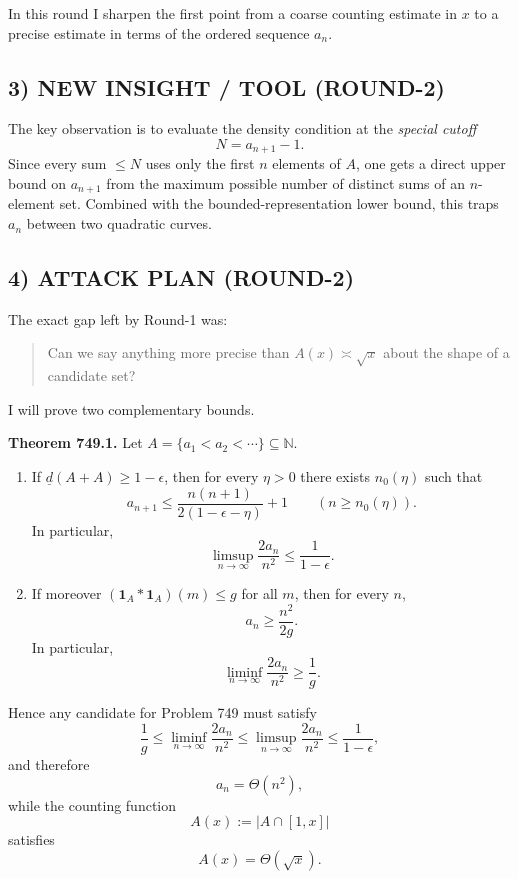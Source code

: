 In this round I sharpen the first point from a coarse counting estimate in $x$ to a precise estimate in terms of the ordered sequence $a_n$.

\subsection*{3) NEW INSIGHT / TOOL (ROUND-2)}

The key observation is to evaluate the density condition at the \emph{special cutoff}
\[
N=a_{n+1}-1.
\]
Since every sum $\le N$ uses only the first $n$ elements of $A$, one gets a direct upper bound on $a_{n+1}$ from the maximum possible number of distinct sums of an $n$-element set. Combined with the bounded-representation lower bound, this traps $a_n$ between two quadratic curves.

\subsection*{4) ATTACK PLAN (ROUND-2)}

The exact gap left by Round-1 was:
\begin{quote}
Can we say anything more precise than $A(x)\asymp \sqrt{x}$ about the shape of a candidate set?
\end{quote}

I will prove two complementary bounds.

\medskip
\noindent
\textbf{Theorem 749.1.}
Let $A=\{a_1<a_2<\cdots\}\subseteq\mathbb N$.

\begin{enumerate}
\item If $\underline d(A+A)\ge 1-\epsilon$, then for every $\eta>0$ there exists $n_0(\eta)$ such that
\[
a_{n+1}\le \frac{n(n+1)}{2(1-\epsilon-\eta)}+1
\qquad (n\ge n_0(\eta)).
\]
In particular,
\[
\limsup_{n\to\infty}\frac{2a_n}{n^2}\le \frac{1}{1-\epsilon}.
\]

\item If moreover $(\mathbf 1_A\ast \mathbf 1_A)(m)\le g$ for all $m$, then for every $n$,
\[
a_n\ge \frac{n^2}{2g}.
\]
In particular,
\[
\liminf_{n\to\infty}\frac{2a_n}{n^2}\ge \frac1g.
\]
\end{enumerate}

Hence any candidate for Problem 749 must satisfy
\[
\frac1g\le \liminf_{n\to\infty}\frac{2a_n}{n^2}
\le
\limsup_{n\to\infty}\frac{2a_n}{n^2}
\le
\frac1{1-\epsilon},
\]
and therefore
\[
a_n=\Theta(n^2),
\]
while the counting function
\[
A(x):=|A\cap[1,x]|
\]
satisfies
\[
A(x)=\Theta(\sqrt x).
\]

